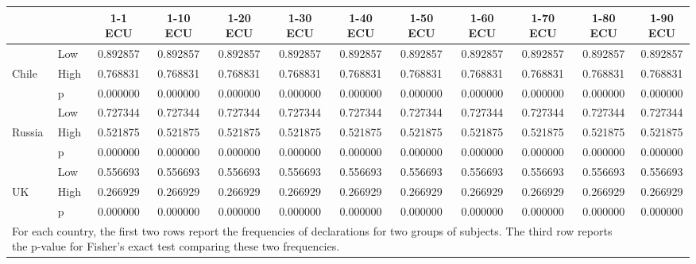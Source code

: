\def\sym#1{\ifmmode^{#1}\else\(^{#1}\)\fi}
\begin{tabular}{|ll|cccccccccc|}
\hline\hline
&&1-1 ECU&1-10 ECU&1-20 ECU&1-30 ECU&1-40 ECU&1-50 ECU&1-60 ECU&1-70 ECU&1-80 ECU&1-90 ECU\\
\hline
&Low& 0.892857& 0.892857& 0.892857& 0.892857& 0.892857& 0.892857& 0.892857& 0.892857& 0.892857& 0.892857\\
Chile&High& 0.768831& 0.768831& 0.768831& 0.768831& 0.768831& 0.768831& 0.768831& 0.768831& 0.768831& 0.768831\\
&p& 0.000000& 0.000000& 0.000000& 0.000000& 0.000000& 0.000000& 0.000000& 0.000000& 0.000000& 0.000000\\
\hline&Low& 0.727344& 0.727344& 0.727344& 0.727344& 0.727344& 0.727344& 0.727344& 0.727344& 0.727344& 0.727344\\
Russia&High& 0.521875& 0.521875& 0.521875& 0.521875& 0.521875& 0.521875& 0.521875& 0.521875& 0.521875& 0.521875\\
&p& 0.000000& 0.000000& 0.000000& 0.000000& 0.000000& 0.000000& 0.000000& 0.000000& 0.000000& 0.000000\\
\hline&Low& 0.556693& 0.556693& 0.556693& 0.556693& 0.556693& 0.556693& 0.556693& 0.556693& 0.556693& 0.556693\\
UK&High& 0.266929& 0.266929& 0.266929& 0.266929& 0.266929& 0.266929& 0.266929& 0.266929& 0.266929& 0.266929\\
&p& 0.000000& 0.000000& 0.000000& 0.000000& 0.000000& 0.000000& 0.000000& 0.000000& 0.000000& 0.000000\\
\hline\multicolumn{11}{p{15cm}}{\tiny For each country, the first two rows report the frequencies of declarations for two groups of subjects. The third row reports the p-value for Fisher's exact test comparing these two frequencies.}\\
\end{tabular}